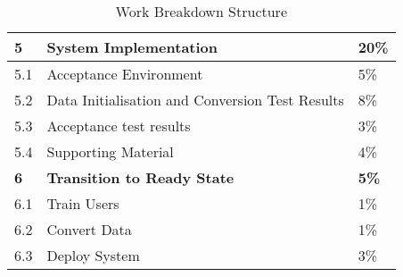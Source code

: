\begin{table}[h]
\begin{tabular}{|p{1cm}|p{10cm}|p{1cm}|}
\textbf{5} & \textbf{System Implementation} & \textbf{20\%} \\ \hline
5.1	& Acceptance Environment & 5\% \\ 
5.2	& Data Initialisation and Conversion Test Results & 8\% \\ 
5.3	& Acceptance test results & 3\% \\ 
5.4	& Supporting Material & 4\% \\ \hline
\textbf{6} & \textbf{Transition to Ready State} & \textbf{5\%} \\ \hline
6.1	& Train Users & 1\% \\ 
6.2	& Convert Data & 1\% \\ 
6.3	& Deploy System & 3\% \\ \hline
\end{tabular}
\caption{Work Breakdown Structure}
\label{tag:WBS}
\end{table}


